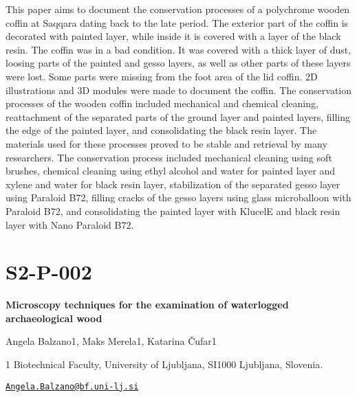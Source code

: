 \documentclass[
]{book}
\begin{document}
This paper aims to document the conservation processes of a polychrome wooden coffin at Saqqara dating back to the late period. The exterior part of the coffin is decorated with painted layer, while inside it is covered with a layer of the black resin. The coffin was in a bad condition. It was covered with a thick layer of dust, loosing parts of the painted and gesso layers, as well as other parts of these layers were lost. Some parts were missing from the foot area of the lid coffin. 2D illustrations and 3D modules were made to document the coffin. The conservation processes of the wooden coffin included mechanical and chemical cleaning, reattachment of the separated parts of the ground layer and painted layers, filling the edge of the painted layer, and consolidating the black resin layer. The materials used for these processes proved to be stable and retrieval by many researchers. The conservation process included mechanical cleaning using soft brushes, chemical cleaning using ethyl alcohol and water for painted layer and xylene and water for black resin layer, stabilization of the separated gesso layer using Paraloid B72, filling cracks of the gesso layers using glass microballoon with Paraloid B72, and consolidating the painted layer with KlucelE and black resin layer with Nano Paraloid B72.

\hypertarget{s2-p-002}{%
\section*{S2-P-002}\label{s2-p-002}}

\textbf{Microscopy techniques for the examination of waterlogged archaeological wood}

Angela Balzano1, Maks Merela1, Katarina Čufar1

1 Biotechnical Faculty, University of Ljubljana, SI1000 Ljubljana, Slovenia.

\href{mailto:Angela.Balzano@bf.uni-lj.si}{\nolinkurl{Angela.Balzano@bf.uni-lj.si}}
\end{document}
